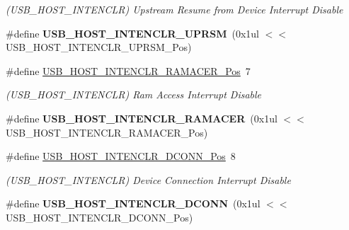 \begin{DoxyCompactItemize}
\begin{DoxyCompactList}\small\item\em (U\+S\+B\+\_\+\+H\+O\+S\+T\+\_\+\+I\+N\+T\+E\+N\+C\+L\+R) Upstream Resume from Device Interrupt Disable \end{DoxyCompactList}\item 
\hypertarget{group___s_a_m_l21___u_s_b_gaed82d6a9a093922be5f5dad9208cf3af}{}\#define {\bfseries U\+S\+B\+\_\+\+H\+O\+S\+T\+\_\+\+I\+N\+T\+E\+N\+C\+L\+R\+\_\+\+U\+P\+R\+S\+M}~(0x1ul $<$$<$ U\+S\+B\+\_\+\+H\+O\+S\+T\+\_\+\+I\+N\+T\+E\+N\+C\+L\+R\+\_\+\+U\+P\+R\+S\+M\+\_\+\+Pos)\label{group___s_a_m_l21___u_s_b_gaed82d6a9a093922be5f5dad9208cf3af}

\item 
\hypertarget{group___s_a_m_l21___u_s_b_ga77a71e060e15b083ecf8e1c46bfad4a9}{}\#define \hyperlink{group___s_a_m_l21___u_s_b_ga77a71e060e15b083ecf8e1c46bfad4a9}{U\+S\+B\+\_\+\+H\+O\+S\+T\+\_\+\+I\+N\+T\+E\+N\+C\+L\+R\+\_\+\+R\+A\+M\+A\+C\+E\+R\+\_\+\+Pos}~7\label{group___s_a_m_l21___u_s_b_ga77a71e060e15b083ecf8e1c46bfad4a9}

\begin{DoxyCompactList}\small\item\em (U\+S\+B\+\_\+\+H\+O\+S\+T\+\_\+\+I\+N\+T\+E\+N\+C\+L\+R) Ram Access Interrupt Disable \end{DoxyCompactList}\item 
\hypertarget{group___s_a_m_l21___u_s_b_ga37be090f8bab71d0f51e758f2b37ef32}{}\#define {\bfseries U\+S\+B\+\_\+\+H\+O\+S\+T\+\_\+\+I\+N\+T\+E\+N\+C\+L\+R\+\_\+\+R\+A\+M\+A\+C\+E\+R}~(0x1ul $<$$<$ U\+S\+B\+\_\+\+H\+O\+S\+T\+\_\+\+I\+N\+T\+E\+N\+C\+L\+R\+\_\+\+R\+A\+M\+A\+C\+E\+R\+\_\+\+Pos)\label{group___s_a_m_l21___u_s_b_ga37be090f8bab71d0f51e758f2b37ef32}

\item 
\hypertarget{group___s_a_m_l21___u_s_b_gaa45a1af9df74efbc6bc277212eb45233}{}\#define \hyperlink{group___s_a_m_l21___u_s_b_gaa45a1af9df74efbc6bc277212eb45233}{U\+S\+B\+\_\+\+H\+O\+S\+T\+\_\+\+I\+N\+T\+E\+N\+C\+L\+R\+\_\+\+D\+C\+O\+N\+N\+\_\+\+Pos}~8\label{group___s_a_m_l21___u_s_b_gaa45a1af9df74efbc6bc277212eb45233}

\begin{DoxyCompactList}\small\item\em (U\+S\+B\+\_\+\+H\+O\+S\+T\+\_\+\+I\+N\+T\+E\+N\+C\+L\+R) Device Connection Interrupt Disable \end{DoxyCompactList}\item 
\hypertarget{group___s_a_m_l21___u_s_b_ga95aa602d635d96842b2cf9ba73326a65}{}\#define {\bfseries U\+S\+B\+\_\+\+H\+O\+S\+T\+\_\+\+I\+N\+T\+E\+N\+C\+L\+R\+\_\+\+D\+C\+O\+N\+N}~(0x1ul $<$$<$ U\+S\+B\+\_\+\+H\+O\+S\+T\+\_\+\+I\+N\+T\+E\+N\+C\+L\+R\+\_\+\+D\+C\+O\+N\+N\+\_\+\+Pos)\label{group___s_a_m_l21___u_s_b_ga95aa602d635d96842b2cf9ba73326a65}


\end{DoxyCompactItemize}
